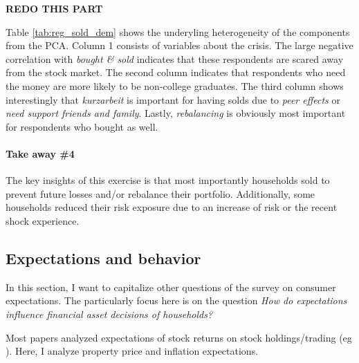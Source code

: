 \documentclass[ProjectABM]{subfiles}
\begin{document}


 \textbf{REDO THIS PART}

Table \ref{tab:reg_sold_dem} shows the underyling heterogeneity of the components from the PCA. Column 1 consists of variables about the crisis. The large negative correlation with \textit{bought \& sold} indicates that these respondents are scared away from the stock market. The second column indicates that respondents who need the money are more likely to be non-college graduates. The third column shows interestingly that \textit{kurzarbeit} is important for having solds due to \textit{peer effects} or \textit{need support friends and family}. Lastly, \textit{rebalancing} is obviously most important for respondents who bought as well.

\paragraph{Take away \#4}
The key insights of this exercise is that most importantly households sold to prevent future losses and/or rebalance their portfolio. Additionally, some households reduced their risk exposure due to an increase of risk or the recent shock experience.

\subsection{Expectations and behavior} \label{sec:results_exp}
In this section, I want to capitalize other questions of the survey on consumer expectations. The particularly focus here is on the question \textit{How do expectations influence financial asset decisions of households?} %

Most papers analyzed expectations of stock returns on stock holdings/trading (eg \cite{dominitz_manski_2011measuring_expectations, giglio_et_al_2019five}). Here, I analyze property price and inflation expectations.%
\end{document}
